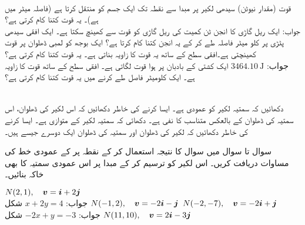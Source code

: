 \\
قوت  (مقدار  نیوٹن) سیدھی لکیر پر مبدا سے نقطہ  تک  ایک جسم کو منتقل کرتا ہے (فاصلہ میٹر میں ہے)۔ یہ قوت کتنا کام کرتی ہے؟\\
جواب:\quad
{}
ایک ریل گاڑی کا انجن  ٹن کمیت کی ریل گاڑی کو  قوت سے کھینچ سکتا ہے۔ ایک افقی سیدھی پٹڑی پر  کلو میٹر فاصلہ طے کر کے یہ انجن کتنا کام کرتا ہے؟
ایک بوجھ کو  لمبی ڈھلوان پر  قوت کھینچتی ہے۔افقی سطح کے ساتھ یہ قوت  کا زاویہ بناتی ہے۔ یہ قوت کتنا کام کرتی ہے؟ \\
جواب:\quad
$\SI{3464.10}{\joule}$
ایک کشتی کے  بادبان پر ہوا  قوت لگاتی ہے۔ افقی سطح کے ساتھ قوت کا زاویہ  ہے۔ ایک کلومیٹر فاصل طے کرنے میں یہ قوت کتنا کام کرتی ہے؟

\\
دکھائیں کہ سمتیہ  لکیر  کو عمودی ہے۔ ایسا کرنے کی خاطر دکھائیں کہ اس لکیر کی ڈھلوان، اس سمتیہ کی ڈھلوان کے بالعکس متناسب کا نفی ہے۔
دکھائی کہ سمتیہ  لکیر  کے متوازی ہے۔ ایسا کرنے کی خاطر دکھائیں کہ لکیر کی ڈھلوان اور سمتیہ کی ڈھلوان ایک دوسرے جیسے  ہیں۔

سوال  تا سوال  میں سوال  کا نتیجہ استعمال کر کے نقطہ  پر   کے عمودی خط کی مساوات دریافت کریں۔ اس لکیر کو ترسیم کر کے مبدا پر اس عمودی سمتیہ کا بھی خاکہ بنائیں۔

$N(2,1),\quad {\ensuremath{{\boldsymbol{v}}}}={\boldsymbol{i}}+2{\boldsymbol{j}}$\\
جواب:\quad
$x+2y=4$\quad
شکل 
$N(-1,2),\quad {\ensuremath{{\boldsymbol{v}}}}=-2{\boldsymbol{i}}-{\boldsymbol{j}}$
$N(-2,-7),\quad {\ensuremath{{\boldsymbol{v}}}}=-2{\boldsymbol{i}}+{\boldsymbol{j}}$\\
جواب:\quad
$-2x+y=-3$\quad
شکل 
$N(11,10),\quad {\ensuremath{{\boldsymbol{v}}}}=2{\boldsymbol{i}}-3{\boldsymbol{j}}$


